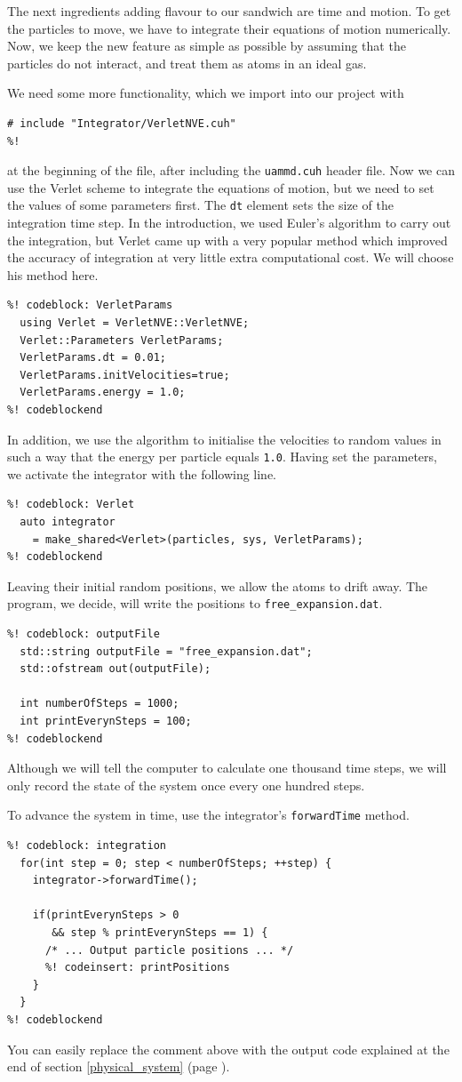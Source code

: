 The next ingredients adding flavour to our sandwich are time and motion. To get
the particles to move, we have to integrate their equations of motion
numerically. Now, we keep the new feature as simple as possible by assuming that
the particles do not interact, and treat them as atoms in an ideal gas.

We need some more functionality, which we import into our project with
\begin{lstlisting}
# include "Integrator/VerletNVE.cuh"
%!
\end{lstlisting}
at the beginning of the file, after including the \texttt{uammd.cuh} header 
file. Now we can use the Verlet scheme to integrate the equations of motion, but 
we need to set the values of some parameters first. The \texttt{dt} element sets 
the size of the integration time step. In the introduction, we used Euler's 
algorithm to carry out the integration, but Verlet came up with a very popular 
method which improved the accuracy of integration at very little extra 
computational cost. We will choose his method here.
\begin{lstlisting}
%! codeblock: VerletParams
  using Verlet = VerletNVE::VerletNVE;
  Verlet::Parameters VerletParams;
  VerletParams.dt = 0.01;
  VerletParams.initVelocities=true;
  VerletParams.energy = 1.0;
%! codeblockend
\end{lstlisting}
In addition, we use the algorithm to initialise the velocities to random values
in such a way that the energy per particle equals \texttt{1.0}. Having set the
parameters, we activate the integrator with the following line.
\begin{lstlisting}
%! codeblock: Verlet
  auto integrator
    = make_shared<Verlet>(particles, sys, VerletParams);
%! codeblockend
\end{lstlisting}

Leaving their initial random positions, we allow the atoms to drift away. The 
program, we decide, will write the positions to \texttt{free\_expansion.dat}.
\begin{lstlisting}
%! codeblock: outputFile
  std::string outputFile = "free_expansion.dat";
  std::ofstream out(outputFile);

  int numberOfSteps = 1000;
  int printEverynSteps = 100;
%! codeblockend
\end{lstlisting}
Although we will tell the computer to calculate one thousand time steps, we
will only record the state of the system once every one hundred steps. 

To advance the system in time, use the integrator's \texttt{forwardTime} method.
\begin{lstlisting}
%! codeblock: integration
  for(int step = 0; step < numberOfSteps; ++step) {
    integrator->forwardTime();

    if(printEverynSteps > 0
       && step % printEverynSteps == 1) {
      /* ... Output particle positions ... */
      %! codeinsert: printPositions
    }
  }
%! codeblockend
\end{lstlisting}
You can easily replace the comment above with the output code explained at the
end of section \ref{physical_system} (page \pageref{particlePositions}).

